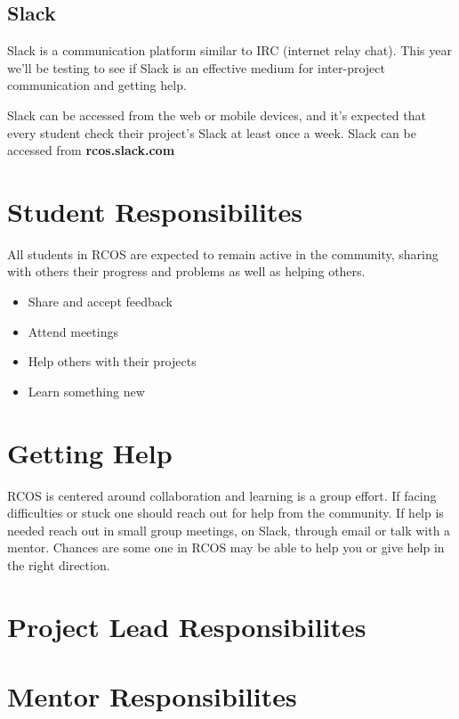\documentclass[12pt]{article}
\begin{document}
    \subsection{Slack}

    Slack is a communication platform similar to IRC (internet relay chat). This year we'll be testing to see if Slack is an effective medium for inter-project communication and getting help.

    Slack can be accessed from the web or mobile devices, and it's expected that every student check their project's Slack at least once a week. Slack can be accessed from \textbf{rcos.slack.com}

    \section{Student Responsibilites}

    All students in RCOS are expected to remain active in the community, sharing with others their progress and problems as well as helping others.

    \begin{itemize}
        \item Share and accept feedback
        \item Attend meetings
        \item Help others with their projects
        \item Learn something new
    \end{itemize}

    \section{Getting Help}

    RCOS is centered around collaboration and learning is a group effort. If facing difficulties or stuck one should reach out for help from the community. If help is needed reach out in small group meetings, on Slack, through email or talk with a mentor. Chances are some one in RCOS may be able to help you or give help in the right direction.

    \section{Project Lead Responsibilites}


    \section{Mentor Responsibilites}
\end{document}
